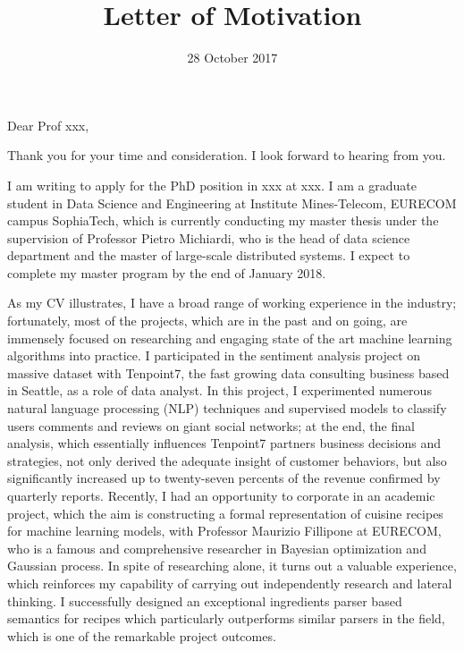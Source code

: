 \documentclass[11pt,a4paper,roman]{moderncv}        %
\title{Letter of Motivation}                               %
\begin{document}
\date{28 October 2017}
\opening{Dear Prof xxx,}
\closing{Thank you for your time and consideration.  I look forward to hearing from you.}
\makelettertitle

I am writing to apply for the PhD position in {xxx} at {xxx}. I am a graduate student in Data Science and Engineering at Institute Mines-Telecom, EURECOM campus SophiaTech, which is currently conducting my master thesis under the supervision of Professor Pietro Michiardi, who is the head of data science department and the master of large-scale distributed systems. I expect to complete my master program by the end of January 2018. 

As my CV illustrates, I have a broad range of working experience in the industry; fortunately, most of the projects, which are in the past and on going, are immensely focused on researching and engaging state of the art machine learning algorithms into practice. I participated in the sentiment analysis project on massive dataset with Tenpoint7, the fast growing data consulting business based in Seattle, as a role of data analyst. In this project, I experimented numerous natural language processing (NLP) techniques and supervised models to classify users comments and reviews on giant social networks; at the end, the final analysis, which essentially influences Tenpoint7 partners business decisions and strategies, not only derived the adequate insight of customer behaviors, but also significantly increased up to twenty-seven percents of the revenue confirmed by quarterly reports. Recently, I had an opportunity to corporate in an academic project, which the aim is constructing a formal representation of cuisine recipes for machine learning models, with Professor Maurizio Fillipone at EURECOM, who is a famous and comprehensive researcher in Bayesian optimization and Gaussian process. In spite of researching alone, it turns out a valuable experience, which reinforces my capability of carrying out independently research and lateral thinking. I successfully designed an exceptional ingredients parser based semantics for recipes which particularly outperforms similar parsers in the field, which is one of the remarkable project outcomes.
\end{document}
